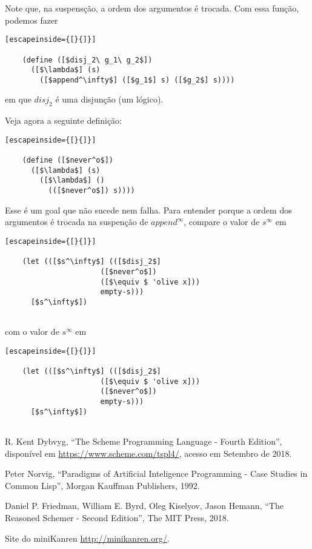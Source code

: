 \documentclass{article}
\begin{document}
  \noindent Note que, na suspensção, a ordem dos argumentos é trocada.
  Com essa função, podemos fazer

  \begin{lstlisting}[escapeinside={[}{]}]

    (define ([$disj_2\ g_1\ g_2$])
      ([$\lambda$] (s)
        ([$append^\infty$] ([$g_1$] s) ([$g_2$] s))))

  \end{lstlisting}
      
  \noindent em que $disj_2$ é uma disjunção (um 
  lógico). 

  Veja agora a seguinte definição:

  \begin{lstlisting}[escapeinside={[}{]}]

    (define ([$never^o$])
      ([$\lambda$] (s)
        ([$\lambda$] ()
          (([$never^o$]) s))))

  \end{lstlisting}

  \noindent Esse é um goal que não sucede nem falha. Para entender
  porque a ordem dos argumentos é trocada na suspenção de $append^\infty$,
  compare o valor de $s^\infty$ em

  \begin{lstlisting}[escapeinside={[}{]}]

    (let (([$s^\infty$] (([$disj_2$]
                      ([$never^o$])
                      ([$\equiv $ 'olive x]))
                      empty-s)))
      [$s^\infty$])
                      
  \end{lstlisting}

  \noindent com o valor de $s^\infty$ em

  \begin{lstlisting}[escapeinside={[}{]}]

    (let (([$s^\infty$] (([$disj_2$]
                      ([$\equiv $ 'olive x]))
                      ([$never^o$])
                      empty-s)))
      [$s^\infty$])
                      
  \end{lstlisting}

  
  

    
  \begin{thebibliography}{1}

   R. Kent Dybvyg,
    ``The Scheme Programming Language - Fourth Edition'',
    disponível em \url{https://www.scheme.com/tspl4/}, acesso em
    Setembro de 2018.

   Peter Norvig,
    ``Paradigms of Artificial Inteligence Programming - Case Studies
    in Common Lisp'',
    Morgan Kauffman Publishers, 1992.

     Daniel P. Friedman, William E. Byrd, Oleg Kiselyov,
      Jason Hemann,
      ``The Reasoned Schemer - Second Edition'',
      The MIT Press, 2018.

       Site do miniKanren \url{http://minikanren.org/}.
      
  \end{thebibliography}
\end{document}
